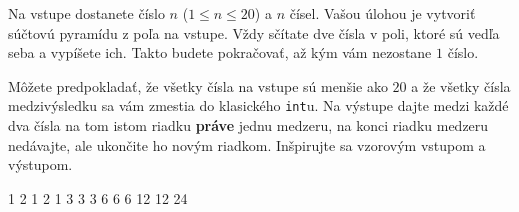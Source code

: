 




Na vstupe dostanete číslo $n$ ($1\leq n \leq 20$) a $n$ čísel. Vašou úlohou je vytvoriť súčtovú
pyramídu z poľa na vstupe. Vždy sčítate dve čísla v poli, ktoré sú vedľa seba a vypíšete ich. Takto
budete pokračovať, až kým vám nezostane $1$ číslo.

Môžete predpokladať, že všetky čísla na vstupe sú menšie ako $20$ a že všetky čísla medzivýsledku sa
vám zmestia do klasického \texttt{int}u. Na výstupe dajte medzi každé dva čísla na tom istom riadku
\textbf{práve} jednu medzeru, na konci riadku medzeru nedávajte, ale ukončite ho novým riadkom.
Inšpirujte sa vzorovým vstupom a výstupom. 

1 2 1 2 1
 3 3 3
6 6 6
12 12
24
\koniec


